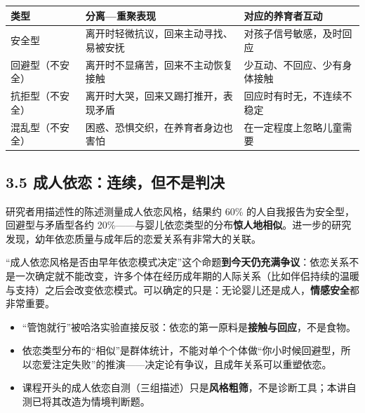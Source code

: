 \documentclass[UTF8,a4paper,11pt]{ctexart}
\begin{document}
\begin{center}
\small
\begin{tabular}{@{}lll@{}}
\toprule
\textbf{类型} & \textbf{分离—重聚表现} & \textbf{对应的养育者互动} \\
\midrule
安全型 & 离开时轻微抗议，回来主动寻找、易被安抚 & 对孩子信号敏感，及时回应 \\
回避型（不安全） & 离开时不显痛苦，回来不主动恢复接触 & 少互动、不回应、少有身体接触 \\
抗拒型（不安全） & 离开时大哭，回来又踢打推开，表现矛盾 & 回应时有时无，不连续不稳定 \\
混乱型（不安全） & 困惑、恐惧交织，在养育者身边也害怕 & 在一定程度上忽略儿童需要 \\
\bottomrule
\end{tabular}
\end{center}

\subsection*{3.5 成人依恋：连续，但不是判决}

研究者用描述性的陈述测量成人依恋风格，结果约 60\% 的人自我报告为安全型，回避型与矛盾型各约 20\%——与婴儿依恋类型的分布\textbf{惊人地相似}。进一步的研究发现，幼年依恋质量与成年后的恋爱关系有非常大的关联。

\begin{keyconcept}
“成人依恋风格是否由早年依恋模式决定”这个命题\textbf{到今天仍充满争议}：依恋关系不是一次确定就不能改变，许多个体在经历成年期的人际关系（比如伴侣持续的温暖与支持）之后会改变依恋模式。可以确定的只是：无论婴儿还是成人，\textbf{情感安全}都非常重要。
\end{keyconcept}

\begin{keyconcept}[易错点与失效边界]
\begin{itemize}
  \item “管饱就行”被哈洛实验直接反驳：依恋的第一原料是\textbf{接触与回应}，不是食物。
  \item 依恋类型分布的“相似”是群体统计，不能对单个个体做“你小时候回避型，所以恋爱注定失败”的推演——决定论有争议，且成年关系可以重塑依恋。
  \item 课程开头的成人依恋自测（三组描述）只是\textbf{风格粗筛}，不是诊断工具；本讲自测已将其改造为情境判断题。
\end{itemize}
\end{keyconcept}
\end{document}
